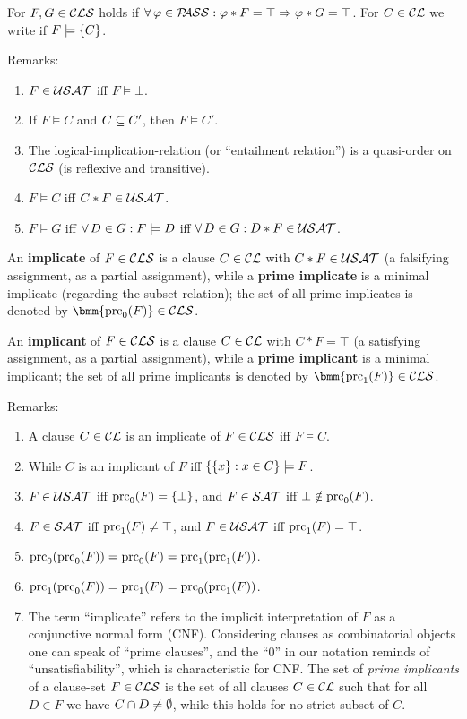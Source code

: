 \documentclass[12pt]{book}
\begin{document}
\begin{defi}\label{def:models}
  For $F, G \in \mathcal{CLS}$ holds  if $\forall\, \varphi \in \mathcal{P\hspace{-0.32em}ASS} : \varphi * F = \top \Rightarrow \varphi * G = \top$. For $C \in \mathcal{CL}$ we write  if $F \models \{ C \}$.
\end{defi}
Remarks:
\begin{enumerate}
\item $F \in \mathcal{USAT}$ iff $F \models \bot$.
\item If $F \models C$ and $C \subseteq C'$, then $F \models C'$.
\item The logical-implication-relation (or ``entailment relation'') is a quasi-order on $\mathcal{CLS}$ (is reflexive and transitive).
\item $F \models C$ iff $C * F \in \mathcal{USAT}$.
\item $F \models G$ iff $\forall\, D \in G : F \models D$ iff $\forall\, D \in G : D * F \in \mathcal{USAT}$.
\end{enumerate}

\begin{defi}\label{def:primec}
  An \textbf{implicate} of $F \in \mathcal{CLS}$ is a clause $C \in \mathcal{CL}$ with $C* F \in \mathcal{USAT}$ (a falsifying assignment, as a partial assignment), 
  while a \textbf{prime implicate} is a minimal implicate (regarding the subset-relation); the set of all prime implicates is denoted by 
  $\bmm{\primec_0(F)} \in \Cls$.

  An \textbf{implicant} of $F \in \mathcal{CLS}$ is a clause $C \in \mathcal{CL}$ with $C * F = \top$ (a satisfying assignment, as a partial assignment), 
  while a \textbf{prime implicant} is a minimal implicant; the set of all prime implicants is denoted by $\bmm{\primec_1(F)} \in \Cls$.
\end{defi}
Remarks:
\begin{enumerate}
      \item A clause $C \in \mathcal{CL}$ is an implicate of $F \in \mathcal{CLS}$ iff $F \models C$.
      \item While $C$ is an implicant of $F$ iff $\{ \{ x \} :x \in C \} \models F$.
      \item $F \in \mathcal{USAT}$ iff $\operatorname{prc}_0(F) = \{ \bot \}$, and $F \in \mathcal{SAT}$ iff $\bot \notin \operatorname{prc}_0(F)$.
      \item $F \in \mathcal{SAT}$ iff $\operatorname{prc}_1(F) \ne \top$, and $F \in \mathcal{USAT}$ iff $\operatorname{prc}_1(F) = \top$.
      \item $\operatorname{prc}_0(\operatorname{prc}_0(F)) = \operatorname{prc}_0(F) = \operatorname{prc}_1(\operatorname{prc}_1(F))$.
      \item $\operatorname{prc}_1(\operatorname{prc}_0(F)) = \operatorname{prc}_1(F) = \operatorname{prc}_0(\operatorname{prc}_1(F))$.
      \item  The term ``implicate'' refers to the implicit interpretation of $F$ as a conjunctive normal form (CNF). Considering clauses as combinatorial objects 
	  one can speak of ``prime clauses'', and the ``$0$'' in our notation reminds of ``unsatisfiability'', which is characteristic for CNF.  
	  The set of \emph{prime implicants} of a clause-set $F \in \mathcal{CLS}$ is the set of all clauses $C \in \mathcal{CL}$ such that for all $D \in F$ we have $C \cap D \not= \emptyset$, while this holds 
	  for no strict subset of $C$.
\end{enumerate}
\end{document}
